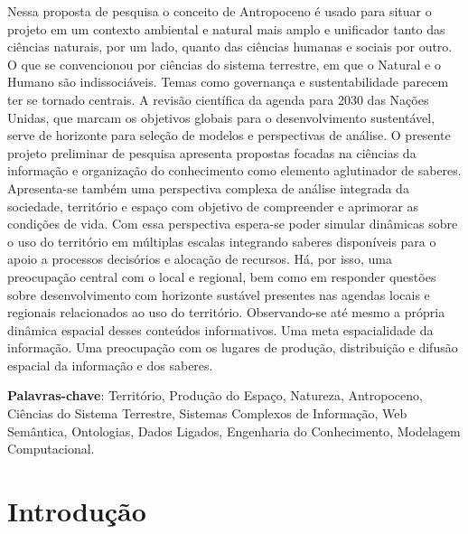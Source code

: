 \documentclass[
	12pt,				%
	openany,			%
	oneside,			%
	a4paper,			%
	english,			%
	french,				%
	spanish,			%
	brazil,				%
	]{abntex2}
\begin{document}
\begin{resumoumacoluna}

Nessa proposta de pesquisa o conceito de Antropoceno é usado para situar o projeto em um contexto ambiental e natural mais amplo e unificador tanto das ciências naturais, por um lado, quanto das ciências humanas e sociais por outro. O que se convencionou por ciências do sistema terrestre, em que o Natural e o Humano são indissociáveis. Temas como governança e sustentabilidade parecem ter se tornado centrais. 
A revisão científica da agenda para 2030 das Nações Unidas, que marcam os objetivos globais para o desenvolvimento sustentável, serve de horizonte para seleção de modelos e perspectivas de análise.
O presente projeto preliminar de pesquisa apresenta propostas focadas na ciências da informação e organização do conhecimento como elemento aglutinador de saberes. 
Apresenta-se também uma perspectiva complexa de análise integrada da sociedade, território e espaço com objetivo de compreender e aprimorar as condições de vida. Com essa perspectiva espera-se poder simular dinâmicas sobre o uso do território em múltiplas escalas integrando saberes disponíveis para o apoio a processos decisórios e alocação de recursos.
Há, por isso, uma preocupação central com o local e regional, bem como em responder questões sobre desenvolvimento com horizonte sustável presentes nas agendas locais e regionais relacionados ao uso do território.
Observando-se até mesmo a própria dinâmica espacial desses conteúdos informativos. Uma meta espacialidade da informação. Uma preocupação com os lugares de produção, distribuição e difusão espacial da informação e dos saberes. %

 \vspace{\onelineskip}
 
 \noindent
 \textbf{Palavras-chave}: Território, Produção do Espaço, Natureza, Antropoceno, Ciências do Sistema Terrestre, Sistemas Complexos de Informação, Web Semântica, Ontologias, Dados Ligados, Engenharia do Conhecimento, Modelagem Computacional.
\end{resumoumacoluna}

\textual

\chapter[Introdução]{Introdução}
\end{document}
